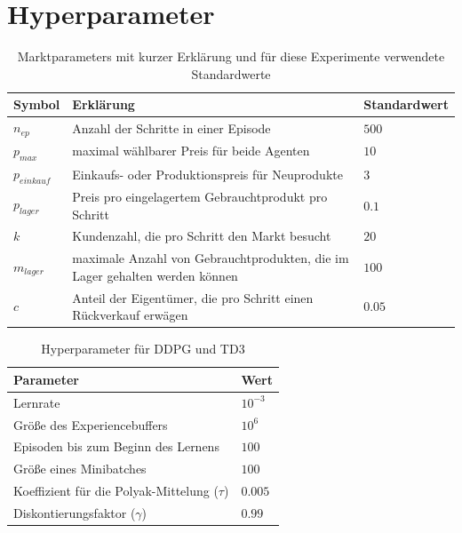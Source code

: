 \section{Hyperparameter}
\label{section:hyperparameter}
\begin{table}[t]
    \centering
    \begin{tabular}{l l l}
        \toprule
        Symbol        & Erklärung                                                                   & Standardwert\\\midrule
        $n_{ep}$      & Anzahl der Schritte in einer Episode                                        & $500$\\
        $p_{max}$     & maximal wählbarer Preis für beide Agenten                                   & $10$\\
        $p_{einkauf}$ & Einkaufs- oder Produktionspreis für Neuprodukte                             & $3$\\
        $p_{lager}$   & Preis pro eingelagertem Gebrauchtprodukt pro Schritt                        & $0.1$\\
        $k$           & Kundenzahl, die pro Schritt den Markt besucht                               & $20$\\
        $m_{lager}$   & maximale Anzahl von Gebrauchtprodukten, die im Lager gehalten werden können & $100$\\
        $c$           & Anteil der Eigentümer, die pro Schritt einen Rückverkauf erwägen            & $0.05$\\\bottomrule
    \end{tabular}
    \caption{Marktparameters mit kurzer Erklärung und für diese Experimente verwendete Standardwerte}
    \label{tab:default_parameters}
\end{table}

\begin{table}[t]
    \centering
    \begin{tabular}{p{} l}
        \toprule
        Parameter                                     & Wert\\\midrule
        Lernrate                                      & $10^{-3}$\\
        Größe des Experiencebuffers                   & $10^6$\\
        Episoden bis zum Beginn des Lernens           & $100$\\
        Größe eines Minibatches                       & $100$\\
        Koeffizient für die Polyak-Mittelung ($\tau$) & $0.005$\\
        Diskontierungsfaktor ($\gamma$)               & $0.99$\\\bottomrule
    \end{tabular}
    \caption{Hyperparameter für DDPG und TD3}
    \label{tab:DDPGHyperparameters}
\end{table}

